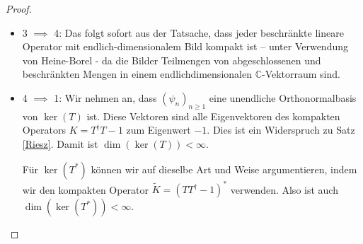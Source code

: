 \documentclass[11pt, hidelinks]{article}
\numberwithin{conj}{section}
\begin{document}
\begin{proof}
\begin{itemize}
    \item 3 $\implies$ 4: Das folgt sofort aus der Tatsache, dass jeder beschränkte lineare Operator mit endlich-dimensionalem Bild kompakt ist -- unter Verwendung von Heine-Borel - da die Bilder Teilmengen von abgeschlossenen und beschränkten Mengen in einem endlichdimensionalen $\mathbb{C}$-Vektorraum sind.
    \item 4 $\implies$ 1: Wir nehmen an, dass $(\psi_n)_{n \geq 1}$ eine unendliche Orthonormalbasis von $\ker(T)$ ist. Diese Vektoren sind alle Eigenvektoren des kompakten Operators $K = T^\dagger T -1$ zum Eigenwert $-1$. Dies ist ein Widerspruch zu Satz \ref{Riesz}. Damit ist $\dim(\ker(T)) < \infty$.

    Für $\ker(T^\ast)$ können wir auf dieselbe Art und Weise argumentieren, indem wir den kompakten Operator $\widetilde{K} = (TT^\dagger -1)^\ast$ verwenden. Also ist auch $\dim(\ker(T^\ast)) < \infty$.


\end{itemize}
\end{proof}
\end{document}
